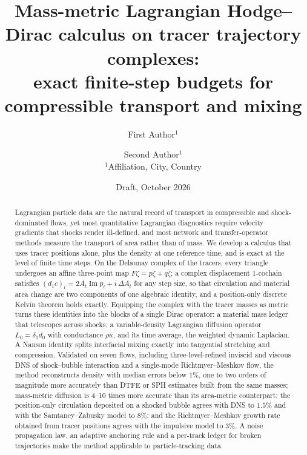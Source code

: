 \documentclass[11pt]{article}
\title{Mass-metric Lagrangian Hodge--Dirac calculus on tracer trajectory complexes:\\ exact finite-step budgets for compressible transport and mixing}
\author{First Author$^{1}$ \and Second Author$^{1}$\\[0.3em]{\small $^1$Affiliation, City, Country}}
\date{Draft, October 2026}
\theoremstyle{definition}\newtheorem{definition}{Definition}\theoremstyle{remark}\newtheorem{remark}{Remark}
\newcommand{\im}{\operatorname{Im}}\newcommand{\re}{\operatorname{Re}}
\begin{document}
\maketitle

\begin{abstract}
Lagrangian particle data are the natural record of transport in compressible and shock-dominated flows, yet most quantitative Lagrangian diagnostics require velocity gradients that shocks render ill-defined, and most network and transfer-operator methods measure the transport of area rather than of mass. We develop a calculus that uses tracer positions alone, plus the density at one reference time, and is exact at the level of finite time steps. On the Delaunay complex of the tracers, every triangle undergoes an affine three-point map $F\zeta=p\zeta+q\bar\zeta$; a complex displacement 1-cochain satisfies $(d_1c)_t=2A_t\im p_t+i\,\Delta A_t$ for any step size, so that circulation and material area change are two components of one algebraic identity, and a position-only discrete Kelvin theorem holds exactly. Equipping the complex with the tracer masses as metric turns these identities into the blocks of a single Dirac operator: a material mass ledger that telescopes across shocks, a variable-density Lagrangian diffusion operator $L_0=\delta_1d_0$ with conductance $\rho\kappa$, and its time average, the weighted dynamic Laplacian. A Nanson identity splits interfacial mixing exactly into tangential stretching and compression. Validated on seven flows, including three-level-refined inviscid and viscous DNS of shock--bubble interaction and a single-mode Richtmyer--Meshkov flow, the method reconstructs density with median errors below $1\%$, one to two orders of magnitude more accurately than DTFE or SPH estimates built from the same masses; mass-metric diffusion is 4--10 times more accurate than its area-metric counterpart; the position-only circulation deposited on a shocked bubble agrees with DNS to $1.5\%$ and with the Samtaney--Zabusky model to $8\%$; and the Richtmyer--Meshkov growth rate obtained from tracer positions agrees with the impulsive model to $3\%$. A noise propagation law, an adaptive anchoring rule and a per-track ledger for broken trajectories make the method applicable to particle-tracking data.
\end{abstract}
\end{document}
